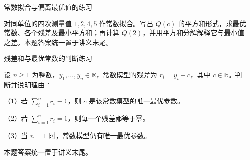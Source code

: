\documentclass[aspectratio=169,10pt,fontset=fandol]{ctexbeamer}
\begin{document}
\begin{frame}[t,fragile]{常数拟合与偏离最优值的练习}
\normalsize
{\normalsize
\begin{exercise}
\label{mathagent:exercise:79e91357ee05b8b9aa4c657d553157f1ef411624d282c3f2337dd0e01453ce2d}
对同单位的四次测量值 $1,2,4,5$ 作常数拟合。写出 $Q(c)$ 的平方和形式，求最优常数、各个残差及最小平方和；再计算 $Q(2)$，并用平方和分解解释它与最小值之差。本题答案统一置于讲义末尾。
\end{exercise}
}
\end{frame}
\begin{frame}[t,fragile]{残差和与最优常数的判断练习}
\normalsize
{\normalsize
\begin{exercise}
\label{mathagent:exercise:9e7dbf7ef17df1506f236bbf1ad6ff8c14ff13065df89e12b796d18475228be7}
设 $n\geq1$ 为整数，$y_1,\ldots,y_n\in\mathbb{R}$，常数模型的残差为 $r_i=y_i-c$，其中 $c\in\mathbb{R}$。判断并说明理由：

（1）若 $\sum_{i=1}^{n}r_i=0$，则 $c$ 是该常数模型的唯一最优参数。

（2）若 $\sum_{i=1}^{n}r_i=0$，则每一个残差都等于零。

（3）当 $n=1$ 时，常数模型仍有唯一最优参数。

本题答案统一置于讲义末尾。
\end{exercise}
}
\end{frame}
\end{document}
